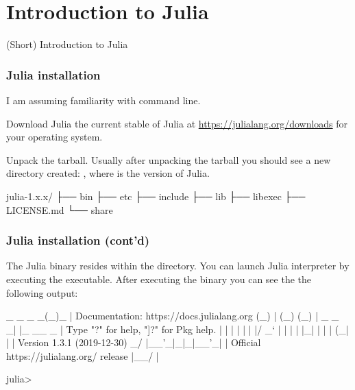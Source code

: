 \section{Introduction to Julia}

\begin{frame}[plain]
\begin{center}
\Huge{(Short) Introduction to Julia}
\end{center}
\end{frame}

\begin{frame}[fragile]
\frametitle{Julia installation}

I am assuming familiarity with command line.

Download Julia the current stable of Julia at
{\scriptsize\url{https://julialang.org/downloads}}
for your operating system.

Unpack the tarball. Usually after unpacking the tarball you should see a new directory
created: , where  is the version of Julia.

\begin{textcode}
julia-1.x.x/
├── bin
├── etc
├── include
├── lib
├── libexec
├── LICENSE.md
└── share
\end{textcode}

\end{frame}


\begin{frame}[fragile]
\frametitle{Julia installation (cont'd)}

The Julia binary resides within the  directory. You can launch Julia interpreter
by executing the  executable. After executing the binary you can see the
the following output:
\begin{textcode}
                _
    _       _ _(_)_     |  Documentation: https://docs.julialang.org
   (_)     | (_) (_)    |
    _ _   _| |_  __ _   |  Type "?" for help, "]?" for Pkg help.
   | | | | | | |/ _` |  |
   | | |_| | | | (_| |  |  Version 1.3.1 (2019-12-30)
  _/ |\__'_|_|_|\__'_|  |  Official https://julialang.org/ release
 |__/                   |
 
 julia>
\end{textcode}

\end{frame}


